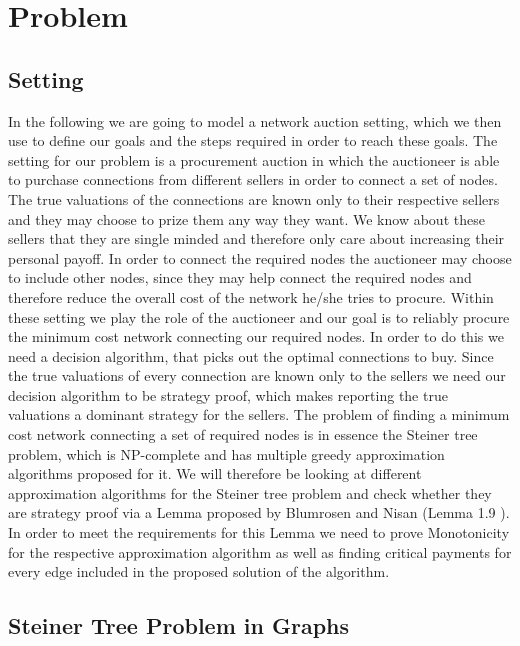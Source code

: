
\chapter{Problem}\label{chapter:problem}

\section{Setting}

In the following we are going to model a network auction setting, which we then use to define our goals and the steps required in order to reach these goals. The setting for our problem is a procurement auction in which the auctioneer is able to purchase connections from different sellers in order to connect a set of nodes. The true valuations of the connections are known only to their respective sellers and they may choose to prize them any way they want. We know about these sellers that they are single minded and therefore only care about increasing their personal payoff. In order to connect the required nodes the auctioneer may choose to include other nodes, since they may help connect the required nodes and therefore reduce the overall cost of the network he/she tries to procure. Within these setting we play the role of the auctioneer and our goal is to reliably procure the minimum cost network connecting our required nodes. In order to do this we need a decision algorithm, that picks out the optimal connections to buy. Since the true valuations of every connection are known only to the sellers we need our decision algorithm to be strategy proof, which makes reporting the true valuations a dominant strategy for the sellers. The problem of finding a minimum cost network connecting a set of required nodes is in essence the Steiner tree problem, which is NP-complete and has multiple greedy approximation algorithms proposed for it. We will therefore be looking at different approximation algorithms for the Steiner tree problem and check whether they are strategy proof via a Lemma proposed by Blumrosen and Nisan (Lemma 1.9 \cite{BlNi07}). In order to meet the requirements for this Lemma we need to prove Monotonicity for the respective approximation algorithm as well as finding critical payments for every edge included in the proposed solution of the algorithm.

\section{Steiner Tree Problem in Graphs}


